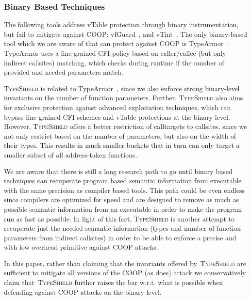 \subsubsection{Binary Based Techniques}
The following tools address vTable protection through binary instrumentation, 
but fail to mitigate against COOP: vfGuard~\cite{vfuard:aravind}, and vTint~\cite{vtint:zhang}. 
The only binary-based tool which we are aware of that can protect against COOP is TypeArmor~\cite{veen:typearmor}. 
TypeArmor uses a fine-grained CFI policy based on caller/callee (but only indirect callsites) matching, which checks 
during runtime if the number of provided and needed parameters match.

\textsc{TypeShield} is related to TypeArmor~\cite{veen:typearmor}, since we also enforce strong binary-level 
invariants on the number of function parameters. Further, \textsc{TypeShield} also aims for exclusive protection 
against advanced exploitation techniques, which can bypass fine-grained CFI schemes and vTable protections at the 
binary level. However, \textsc{TypeShield} offers a better restriction of calltargets to callsites, since we not 
only restrict based on the number of parameters, but also on the width of their types. This results in much smaller 
buckets that in turn can only target a smaller subset of all address-taken functions. 

We are aware that there is still a long research path to go until binary based techniques can 
recuperate program based semantic information from executable with the same precision as compiler based tools.
This path could be even endless since compilers are optimized for speed and are designed to remove as much as possible semantic information
from an executable in order to make the program run as fast as possible. In light of this fact,
\textsc{TypeShield} is another attempt to recuperate just the needed semantic information (types and number of function parameters from
indirect callsites) in order to be able to enforce a precise and with low overhead primitive against COOP attacks.

In this paper, rather than claiming that the invariants offered by~\textsc{TypeShield} are sufficient
to mitigate all versions of the COOP (as \cite{veen:typearmor} does) attack we conservatively claim that~\textsc{TypeShield} 
further raises the bar w.r.t. what is possible when defending against COOP attacks on the binary level.

